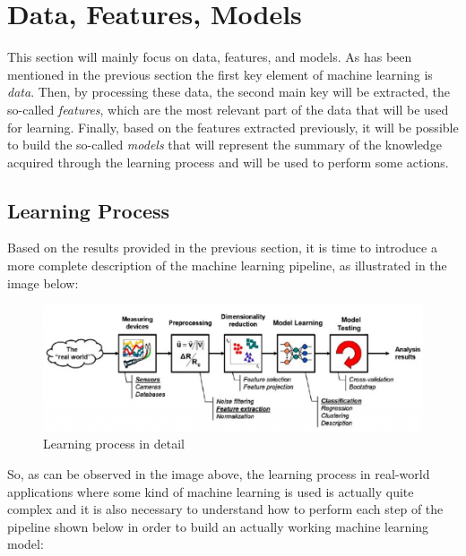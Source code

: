 \section{Data, Features, Models}

This section will mainly focus on data, features, and models.
As has been mentioned in the previous section the first key element
of machine learning is \emph{data}. Then, by processing these data,
the second main key will be extracted, the so-called \emph{features},
which are the most relevant part of the data that will be used for
learning. Finally, based on the features extracted previously, it will
be possible to build the so-called \emph{models} that will represent the
summary of the knowledge acquired through the learning process and will
be used to perform some actions.

\subsection{Learning Process}

Based on the results provided in the previous section, it is time to
introduce a more complete description of the machine learning pipeline,
as illustrated in the image below:

\vspace{5mm}

\begin{figure}[h]
      \centering
      \includegraphics[width=\textwidth]{../img/Learning_process}
      \caption{Learning process in detail}
\end{figure}

\newpage

So, as can be observed in the image above, the learning process
in real-world applications where some kind of machine learning is
used is actually quite complex and it is also necessary to understand
how to perform each step of the pipeline shown below in order to build
an actually working machine learning model:

